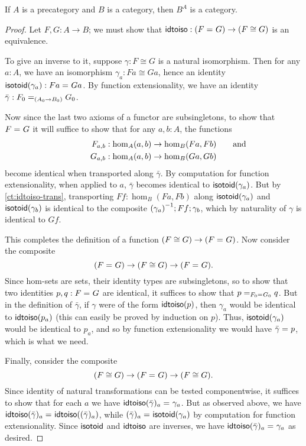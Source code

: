 \begin{thm}\label{ct:functor-cat}
  If $A$ is a precategory and $B$ is a category, then $B^A$ is a category.
\end{thm}
\begin{proof}
  Let $F,G:A\to B$; we must show that $\idtoiso:(\id{F}{G}) \to (F\cong G)$ is an equivalence.

  To give an inverse to it, suppose $\gamma:F\cong G$ is a natural isomorphism.  Then for any $a:A$, we have an isomorphism $\gamma_a:Fa \cong Ga$, hence an identity $\isotoid(\gamma_a):\id{Fa}{Ga}$.  By function extensionality, we have an identity $\bar{\gamma}:\id[(A_0\to B_0)]{F_0}{G_0}$.

  Now since the last two axioms of a functor are subsingletons, to show that $\id{F}{G}$ it will suffice to show that for any $a,b:A$, the functions
  \begin{align*}
    F_{a,b}&:\hom_A(a,b) \to \hom_B(Fa,Fb)\mathrlap{\qquad\text{and}}\\
    G_{a,b}&:\hom_A(a,b) \to \hom_B(Ga,Gb)
  \end{align*}
  become identical when transported along $\bar\gamma$.  By computation for function extensionality, when applied to $a$, $\bar\gamma$ becomes identical to $\isotoid(\gamma_a)$.  But by \autoref{ct:idtoiso-trans}, transporting $Ff:\hom_B(Fa,Fb)$ along $\isotoid(\gamma_a)$ and $\isotoid(\gamma_b)$ is identical to the composite $\inv{(\gamma_a)};Ff;\gamma_b$, which by naturality of $\gamma$ is identical to $Gf$.

  This completes the definition of a function $(F\cong G) \to (\id F G)$.  Now consider the composite
  \[ (\id F G) \to (F\cong G) \to (\id F G). \]
  Since hom-sets are sets, their identity types are subsingletons, so to show that two identities $p,q:\id F G$ are identical, it suffices to show that $\id[\id{F_0}{G_0}]{p}{q}$.
  But in the definition of $\bar\gamma$, if $\gamma$ were of the form $\idtoiso(p)$, then $\gamma_a$ would be identical to $\idtoiso(p_a)$ (this can easily be proved by induction on $p$).
  Thus, $\isotoid(\gamma_a)$ would be identical to $p_a$, and so by function extensionality we would have $\id{\bar\gamma}{p}$, which is what we need.

  Finally, consider the composite
  \[(F\cong G)\to  (\id F G) \to (F\cong G). \]
  Since identity of natural transformations can be tested componentwise, it suffices to show that for each $a$ we have $\id{\idtoiso(\bar\gamma)_a}{\gamma_a}$.  But as observed above, we have $\id{\idtoiso(\bar\gamma)_a}{\idtoiso((\bar\gamma)_a)}$, while $\id{(\bar\gamma)_a}{\isotoid(\gamma_a)}$ by computation for function extensionality.  Since $\isotoid$ and $\idtoiso$ are inverses, we have $\id{\idtoiso(\bar\gamma)_a}{\gamma_a}$ as desired.
\end{proof}

